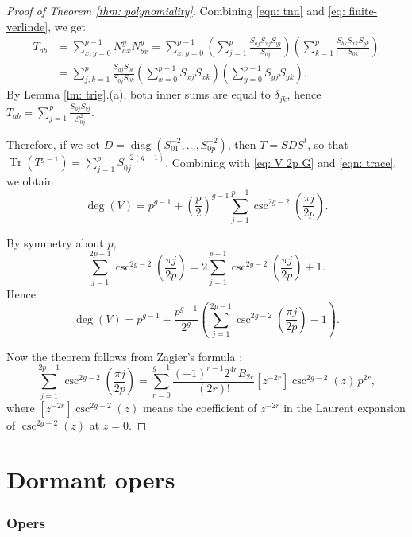 \documentclass[11pt]{amsart}
\begin{document}
\begin{proof}[Proof of Theorem \ref{thm: polynomiality}]
Combining \eqref{eqn: tnn} and \eqref{eq: finite-verlinde}, we get
\[
\begin{aligned}
T_{ab}
&=
\sum_{x,y=0}^{p-1}N_{ax}^{y}N_{bx}^{y} =
\sum_{x,y=0}^{p-1}
\left(\sum_{j=1}^{p}\frac{S_{aj}S_{xj}S_{yj}}{S_{0j}}\right)
\left(\sum_{k=1}^{p}\frac{S_{bk}S_{xk}S_{yk}}{S_{0k}}\right) \\
&=
\sum_{j,k=1}^{p}
\frac{S_{aj}S_{bk}}{S_{0j}S_{0k}}
\left(\sum_{x=0}^{p-1}S_{xj}S_{xk}\right)
\left(\sum_{y=0}^{p-1}S_{yj}S_{yk}\right).
\end{aligned}
\]
By Lemma \ref{lm: trig}.(a), both inner sums are equal to $\delta_{jk}$, hence
$T_{ab}
=
\sum_{j=1}^p \frac{S_{aj}S_{bj}}{S_{0j}^2}$.

 Therefore, if we set $D=\operatorname{diag}\left(S_{01}^{-2},\ldots,S_{0p}^{-2}\right)$,
then
$T=SDS^t$, so that $\operatorname{Tr}(T^{g-1})
=
\sum_{j=1}^p S_{0j}^{-2(g-1)}$.
Combining with \eqref{eq: V 2p G} and \eqref{eqn: trace},
we obtain
\begin{equation}\label{eqn: deg trig}
\deg(V)
=
p^{g-1}
+
\left(\frac p2\right)^{g-1}
\sum_{j=1}^{p-1}
\csc^{2g-2}\left(\frac{\pi j}{2p}\right).
\end{equation}


By symmetry about $p$,
\[
\sum_{j=1}^{2p-1}
\csc^{2g-2}\left(\frac{\pi j}{2p}\right)
=
2\sum_{j=1}^{p-1}
\csc^{2g-2}\left(\frac{\pi j}{2p}\right)+1.
\]
Hence
\[
\deg(V)
=
p^{g-1}
+
\frac{p^{g-1}}{2^g}
\left(
\sum_{j=1}^{2p-1}
\csc^{2g-2}\left(\frac{\pi j}{2p}\right)-1
\right).
\]

Now the theorem follows from Zagier's formula \cite[Theorem 1(i),(iii)]{Zagier}:
\[
\sum_{j=1}^{2p-1}
\csc^{2g-2}\left(\frac{\pi j}{2p}\right)
=
\sum_{r=0}^{g-1}
\frac{(-1)^{r-1}2^{4r}B_{2r}}{(2r)!}
\left[z^{-2r}\right]
\csc^{2g-2}(z)
\,p^{2r},
\]
where $\left[z^{-2r}\right]
\csc^{2g-2}(z)$ means the coefficient of $z^{-2r}$ in the Laurent expansion of $\csc^{2g-2}(z)$ at $z=0$.
\end{proof}


\section{Dormant opers}\label{sec: oper}


\subsubsection*{Opers}\;
\end{document}
